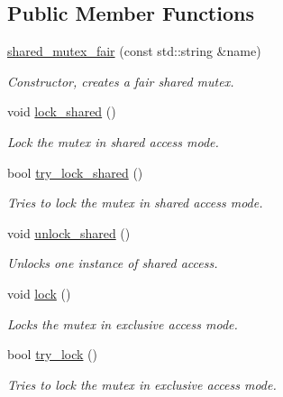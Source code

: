 \subsection*{Public Member Functions}
\begin{DoxyCompactItemize}
\item 
\hyperlink{classcpen333_1_1process_1_1impl_1_1shared__mutex__fair_a4a46bce7595b9f2a29067723f3b72b5e}{shared\+\_\+mutex\+\_\+fair} (const std\+::string \&name)
\begin{DoxyCompactList}\small\item\em Constructor, creates a fair shared mutex. \end{DoxyCompactList}\item 
void \hyperlink{classcpen333_1_1process_1_1impl_1_1shared__mutex__fair_a11641159a61a83eda9713891f9f29159}{lock\+\_\+shared} ()
\begin{DoxyCompactList}\small\item\em Lock the mutex in shared access mode. \end{DoxyCompactList}\item 
bool \hyperlink{classcpen333_1_1process_1_1impl_1_1shared__mutex__fair_a1d1a77e135745777f6476fe0abcca078}{try\+\_\+lock\+\_\+shared} ()
\begin{DoxyCompactList}\small\item\em Tries to lock the mutex in shared access mode. \end{DoxyCompactList}\item 
void \hyperlink{classcpen333_1_1process_1_1impl_1_1shared__mutex__fair_afa970da78252148b1ff049be3c239155}{unlock\+\_\+shared} ()
\begin{DoxyCompactList}\small\item\em Unlocks one instance of shared access. \end{DoxyCompactList}\item 
void \hyperlink{classcpen333_1_1process_1_1impl_1_1shared__mutex__fair_a85de84ee97bdf015411169a02935dc4d}{lock} ()
\begin{DoxyCompactList}\small\item\em Locks the mutex in exclusive access mode. \end{DoxyCompactList}\item 
bool \hyperlink{classcpen333_1_1process_1_1impl_1_1shared__mutex__fair_aaac6ea293ec760cb35eefeb004503e9a}{try\+\_\+lock} ()
\begin{DoxyCompactList}\small\item\em Tries to lock the mutex in exclusive access mode. \end{DoxyCompactList}\item 

\end{DoxyCompactItemize}
